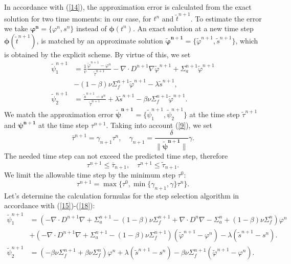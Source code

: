 \documentclass[runningheads]{llncs}
\begin{document}
In accordance with (\ref{14}), the approximation error is calculated from the exact solution for two time moments: in our case, for $t^n$ and $\widetilde{t}^{n+1}$.
To estimate the error we take $\bm{\varphi^n} = \{\varphi^n, s^n\}$ instead of $\bm{\phi}(t^n)$. An exact solution at a new time step $\bm{\phi}(\widetilde{t}^{n+1})$, is matched by an approximate solution $\bm{\widetilde{\varphi}^{n+1}} = \{\widetilde{\varphi}^{n+1}, \widetilde{s}^{n+1}\}$, which is obtained by the explicit scheme. By virtue of this, we set
\begin{equation}\label{16}
\begin{split}
\widetilde\psi^{n+1}_1  & =  \frac{1}{v} \frac{\widetilde\varphi^{n+1}-\varphi^n}{\widetilde\tau^{n+1}} - \nabla \cdot D^{n+1} \nabla \widetilde\varphi^{n+1} + \Sigma_{a}^{n+1} \widetilde\varphi^{n+1} \\
&- (1-\beta) \nu \Sigma^{n+1}_{f} \widetilde\varphi^{n+1} - \lambda \widetilde s^{n+1}, \\
\widetilde\psi^{n+1}_2  & =  \frac{\widetilde s^{n+1}-s^n}{\widetilde\tau^{n+1}} + \lambda \widetilde s^{n+1} - \beta \nu\Sigma_{f}^{n+1} \widetilde\varphi^{n+1}.
\end{split}
\end{equation} 
We match the approximation error $\bm{\widetilde{\psi}^{n+1} }= \{\widetilde{\psi}^{n+1}_1, \widetilde{\psi}^{n+1}_2\}$ at the time step $\widetilde{\tau}^{n+1}$ and $\bm{\psi^{n+1}}$ at the time step $\tau^{n+1}$.
Taking into account (\ref{9}), we set
\begin{equation}\label{17}
  \bar{\tau}^{n+1} = \gamma_{n+1} \tau^n,
  \quad \gamma_{n+1} = \frac{\delta}{\| \bm{\widetilde{\psi}^{n+1}}\|}  \gamma.
\end{equation} 
The needed time step can not exceed the predicted time step, therefore
\[
\tau^{n+1} \leq \bar{\tau}_{n+1}, \quad \tau^{n+1} \leq \widetilde{\tau}_{n+1}.
\] 
We limit the allowable time step by the minimum step $\tau^0$:
\begin{equation}\label{18}
 \tau^{n+1} = \max \big \{\tau^0, \min \{\gamma_{n+1}, \gamma \} \tau^n \big \}. 
\end{equation}
Let's determine  the calculation formulas for the step selection algorithm in accordance with (\ref{15})-(\ref{18}):
\[
 \begin{split}
 \widetilde{\psi}^{n+1}_1  &  =  (- \nabla \cdot D^{n+1} \nabla  + \Sigma_{a}^{n+1}  - (1-\beta) \nu \Sigma^{n+1}_{f}  + \nabla \cdot D^n \nabla - \Sigma^n_{a} + (1-\beta) \nu \Sigma^n_{f}) \varphi^{n} \\
& + (- \nabla \cdot D^{n+1} \nabla  + \Sigma_{a}^{n+1}  - (1-\beta) \nu \Sigma^{n+1}_{f}) (\widetilde{\varphi}^{n+1} - \varphi^n) - \lambda (\widetilde{s}^{n+1} - s^n).\\
 \widetilde{\psi}^{n+1}_2 &  =   (-\beta\nu\Sigma^{n+1}_f + \beta\nu\Sigma^{n}_f)\varphi^n + \lambda (\widetilde s^{n+1} - s^n) - \beta\nu\Sigma^{n+1}_f (\widetilde\varphi^{n+1} - \varphi^n) .
 \end{split} 
\] 
\end{document}
